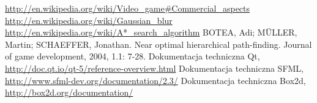 \documentclass[licencjacka]{pracamgr}
\begin{document}
\begin{thebibliography}{99}

   \url{http://en.wikipedia.org/wiki/Video_game#Commercial_aspects}
   \url{http://en.wikipedia.org/wiki/Gaussian_blur}
   \url{http://en.wikipedia.org/wiki/A*_search_algorithm}
   BOTEA, Adi; MÜLLER, Martin; SCHAEFFER, Jonathan. Near optimal hierarchical path-finding. Journal of game development, 2004, 1.1: 7-28.
   Dokumentacja techniczna Qt, \url{http://doc.qt.io/qt-5/reference-overview.html}
   Dokumentacja techniczna SFML, \url{http://www.sfml-dev.org/documentation/2.3/}
   Dokumentacja techniczna Box2d, \url{http://box2d.org/documentation/}
  
  
\end{thebibliography}
\end{document}
